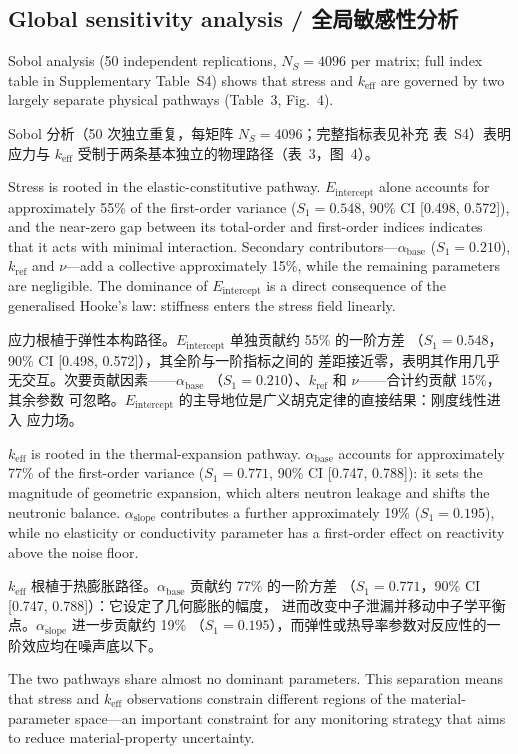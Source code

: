\documentclass[11pt,a4paper]{article}
\newcommand{\keff}{\ensuremath{k_{\mathrm{eff}}}}
\newcommand{\Eint}{\ensuremath{E_{\mathrm{intercept}}}}
\newcommand{\abase}{\ensuremath{\alpha_{\mathrm{base}}}}
\newcommand{\aslope}{\ensuremath{\alpha_{\mathrm{slope}}}}
\newcommand{\kref}{\ensuremath{k_{\mathrm{ref}}}}
\begin{document}
\subsection{Global sensitivity analysis / 全局敏感性分析}

Sobol analysis (50 independent replications, $N_S = 4096$ per matrix;
full index table in Supplementary Table~S4) shows that stress and
\keff{} are governed by two largely separate physical pathways
(Table~3, Fig.~4).

Sobol 分析（50 次独立重复，每矩阵 $N_S = 4096$；完整指标表见补充
表~S4）表明应力与 \keff{} 受制于两条基本独立的物理路径（表~3，图~4）。

Stress is rooted in the elastic-constitutive pathway. \Eint{} alone
accounts for approximately 55\% of the first-order variance
($S_1 = 0.548$, 90\% CI [0.498, 0.572]), and the near-zero gap between
its total-order and first-order indices indicates that it acts with
minimal interaction. Secondary contributors---\abase{}
($S_1 = 0.210$), \kref{} and $\nu$---add a collective approximately
15\%, while the remaining parameters are negligible. The dominance of
\Eint{} is a direct consequence of the generalised Hooke's law:
stiffness enters the stress field linearly.

应力根植于弹性本构路径。\Eint{} 单独贡献约 55\% 的一阶方差
（$S_1 = 0.548$，90\% CI [0.498, 0.572]），其全阶与一阶指标之间的
差距接近零，表明其作用几乎无交互。次要贡献因素——\abase{}
（$S_1 = 0.210$）、\kref{} 和 $\nu$——合计约贡献 15\%，其余参数
可忽略。\Eint{} 的主导地位是广义胡克定律的直接结果：刚度线性进入
应力场。

\keff{} is rooted in the thermal-expansion pathway. \abase{} accounts
for approximately 77\% of the first-order variance
($S_1 = 0.771$, 90\% CI [0.747, 0.788]): it sets the magnitude of
geometric expansion, which alters neutron leakage and shifts the
neutronic balance. \aslope{} contributes a further approximately 19\%
($S_1 = 0.195$), while no elasticity or conductivity parameter has a
first-order effect on reactivity above the noise floor.

\keff{} 根植于热膨胀路径。\abase{} 贡献约 77\% 的一阶方差
（$S_1 = 0.771$，90\% CI [0.747, 0.788]）：它设定了几何膨胀的幅度，
进而改变中子泄漏并移动中子学平衡点。\aslope{} 进一步贡献约 19\%
（$S_1 = 0.195$），而弹性或热导率参数对反应性的一阶效应均在噪声底以下。

The two pathways share almost no dominant parameters. This separation
means that stress and \keff{} observations constrain different regions
of the material-parameter space---an important constraint for any
monitoring strategy that aims to reduce material-property uncertainty.
\end{document}

